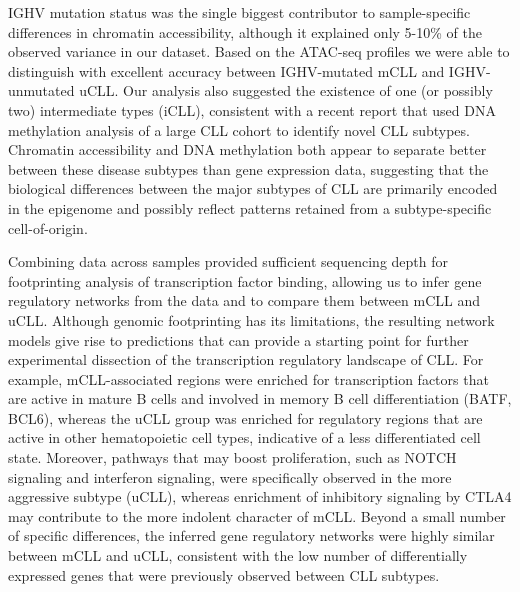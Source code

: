 \documentclass[10pt,]{article}
\begin{document}
IGHV mutation status was the single biggest contributor to
sample-specific differences in chromatin accessibility, although it
explained only 5-10\% of the observed variance in our dataset. Based on
the ATAC-seq profiles we were able to distinguish with excellent
accuracy between IGHV-mutated mCLL and IGHV-unmutated uCLL. Our analysis
also suggested the existence of one (or possibly two) intermediate types
(iCLL), consistent with a recent report that used DNA methylation
analysis of a large CLL cohort to identify novel CLL
subtypes\citep{Kulis2012}. Chromatin accessibility and DNA methylation
both appear to separate better between these disease subtypes than gene
expression data, suggesting that the biological differences between the
major subtypes of CLL are primarily encoded in the epigenome and
possibly reflect patterns retained from a subtype-specific
cell-of-origin.

Combining data across samples provided sufficient sequencing depth for
footprinting analysis of transcription factor binding, allowing us to
infer gene regulatory networks from the data and to compare them between
mCLL and uCLL. Although genomic footprinting has its
limitations\citep{Sung2016}, the resulting network models give rise to
predictions that can provide a starting point for further experimental
dissection of the transcription regulatory landscape of CLL. For
example, mCLL-associated regions were enriched for transcription factors
that are active in mature B cells and involved in memory B cell
differentiation (BATF, BCL6), whereas the uCLL group was enriched for
regulatory regions that are active in other hematopoietic cell types,
indicative of a less differentiated cell state. Moreover, pathways that
may boost proliferation, such as NOTCH signaling\citep{Rosati2009} and
interferon signaling\citep{Tomic2013}, were specifically observed in the
more aggressive subtype (uCLL), whereas enrichment of inhibitory
signaling by CTLA4 may contribute to the more indolent character of
mCLL\citep{Mittal2013}. Beyond a small number of specific differences,
the inferred gene regulatory networks were highly similar between mCLL
and uCLL, consistent with the low number of differentially expressed
genes that were previously observed between CLL
subtypes\citep{Ferreira2014, Klein2001, Rosenwald2001}.
\end{document}
